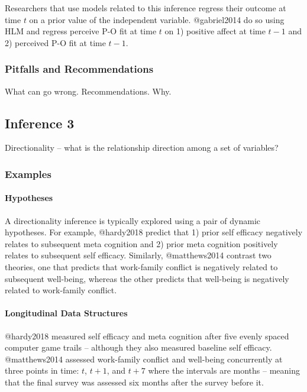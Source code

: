 \documentclass[]{article}
\let\oldparagraph\paragraph
\renewcommand{\paragraph}[1]{\oldparagraph{#1}\mbox{}}
\begin{document}
Researchers that use models related to this inference regress their
outcome at time \(t\) on a prior value of the independent variable.
@gabriel2014 do so using HLM and regress perceive P-O fit at time \(t\)
on 1) positive affect at time \(t-1\) and 2) perceived P-O fit at time
\(t-1\).

\hypertarget{pitfalls-and-recommendations-8}{%
\subsubsection{Pitfalls and
Recommendations}\label{pitfalls-and-recommendations-8}}

What can go wrong. Recommendations. Why.

\hypertarget{inference-3-1}{%
\subsection{Inference 3}\label{inference-3-1}}

Directionality -- what is the relationship direction among a set of
variables?

\hypertarget{examples-9}{%
\subsubsection{Examples}\label{examples-9}}

\hypertarget{hypotheses-9}{%
\paragraph{Hypotheses}\label{hypotheses-9}}

A directionality inference is typically explored using a pair of dynamic
hypotheses. For example, @hardy2018 predict that 1) prior self efficacy
negatively relates to subsequent meta cognition and 2) prior meta
cognition positively relates to subsequent self efficacy. Similarly,
@matthews2014 contrast two theories, one that predicts that work-family
conflict is negatively related to subsequent well-being, whereas the
other predicts that well-being is negatively related to work-family
conflict.

\hypertarget{longitudinal-data-structures-3}{%
\paragraph{Longitudinal Data
Structures}\label{longitudinal-data-structures-3}}

@hardy2018 measured self efficacy and meta cognition after five evenly
spaced computer game trails -- although they also measured baseline self
efficacy. @matthews2014 assessed work-family conflict and well-being
concurrently at three points in time: \(t\), \(t+1\), and \(t+7\) where
the intervals are months -- meaning that the final survey was assessed
six months after the survey before it.
\end{document}
